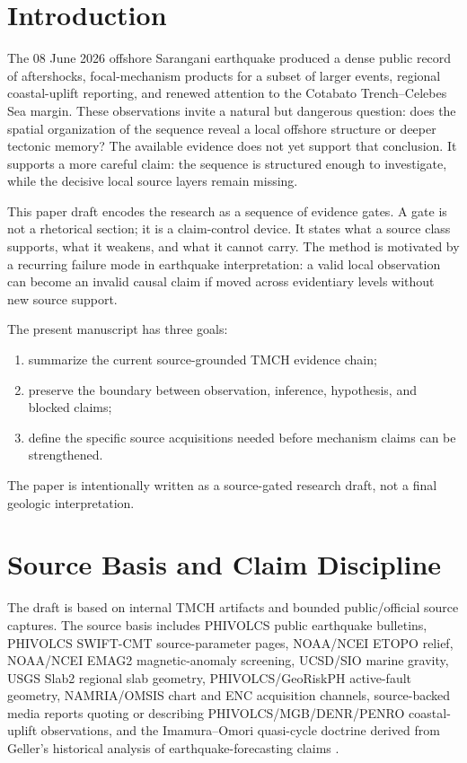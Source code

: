 \documentclass[11pt]{article}
\begin{document}
\section{Introduction}

The 08 June 2026 offshore Sarangani earthquake produced a dense public record of aftershocks, focal-mechanism products for a subset of larger events, regional coastal-uplift reporting, and renewed attention to the Cotabato Trench--Celebes Sea margin. These observations invite a natural but dangerous question: does the spatial organization of the sequence reveal a local offshore structure or deeper tectonic memory? The available evidence does not yet support that conclusion. It supports a more careful claim: the sequence is structured enough to investigate, while the decisive local source layers remain missing.

This paper draft encodes the research as a sequence of evidence gates. A gate is not a rhetorical section; it is a claim-control device. It states what a source class supports, what it weakens, and what it cannot carry. The method is motivated by a recurring failure mode in earthquake interpretation: a valid local observation can become an invalid causal claim if moved across evidentiary levels without new source support.

The present manuscript has three goals:
\begin{enumerate}[leftmargin=2em]
  \item summarize the current source-grounded TMCH evidence chain;
  \item preserve the boundary between observation, inference, hypothesis, and blocked claims;
  \item define the specific source acquisitions needed before mechanism claims can be strengthened.
\end{enumerate}

The paper is intentionally written as a source-gated research draft, not a final geologic interpretation.

\section{Source Basis and Claim Discipline}

The draft is based on internal TMCH artifacts and bounded public/official source captures. The source basis includes PHIVOLCS public earthquake bulletins, PHIVOLCS SWIFT-CMT source-parameter pages, NOAA/NCEI ETOPO relief, NOAA/NCEI EMAG2 magnetic-anomaly screening, UCSD/SIO marine gravity, USGS Slab2 regional slab geometry, PHIVOLCS/GeoRiskPH active-fault geometry, NAMRIA/OMSIS chart and ENC acquisition channels, source-backed media reports quoting or describing PHIVOLCS/MGB/DENR/PENRO coastal-uplift observations, and the Imamura--Omori quasi-cycle doctrine derived from Geller's historical analysis of earthquake-forecasting claims \cite{phivolcs-latest,phivolcs-swift,namria-products,etopo,emag2,sandwell,slab2,geller2023,tmch-v05,kitayo-ladder,namria-gate,phivolcs-catalog-gate}.
\end{document}
